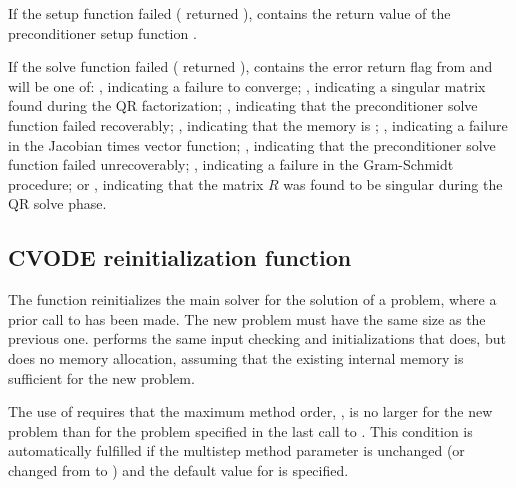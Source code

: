 {
  If the {\cvspgmr} setup function failed ( returned
  ),  contains the return value of the
  preconditioner setup function .

  If the {\cvspgmr} solve function failed ( returned
  ),  contains the error return flag from
   and will be one of:
 , indicating a failure to converge;
 , indicating a singular matrix found during the QR
  factorization;
 , indicating that the preconditioner solve function
  failed recoverably;
  , indicating that the {\spgmr} memory is ;
  , indicating a failure in the Jacobian times vector
  function;
  , indicating that the preconditioner solve
  function  failed unrecoverably;
  , indicating a failure in the Gram-Schmidt procedure; 
  or , indicating that the matrix $R$ was found to be
  singular during the QR solve phase.
}

\subsection{CVODE reinitialization function}\label{sss:cvreinit}

The function  reinitializes the main {\cvode} solver for
the solution of a problem, where a prior call to  has
been made. The new problem must have the same size as the previous one.
 performs the same input checking and initializations 
that  does, but does no memory allocation, assuming that the 
existing internal memory is sufficient for the new problem.             
                                                                 
The use of  requires that the maximum method order,    
, is no larger for the new problem than for the problem  
specified in the last call to .  This condition is  
automatically fulfilled if the multistep method parameter   
is unchanged (or changed from  to ) and the default    
value for  is specified.

